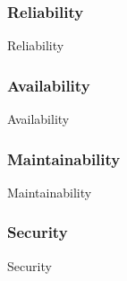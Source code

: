 \subsubsection{Reliability}
{Reliability}

\subsubsection{Availability}
{Availability}


\subsubsection{Maintainability}
{Maintainability}

\subsubsection{Security}
{Security}